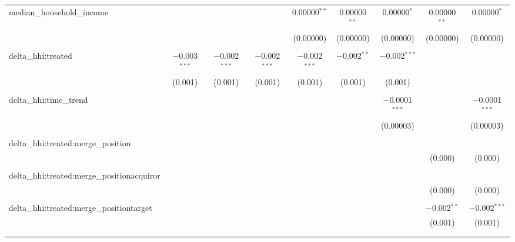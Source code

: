 \begin{table}[H]
{\begin{tabular}{@{\extracolsep{5pt}}lcccccccc}
  median\_household\_income &  &  &  & 0.00000$^{**}$ & 0.00000$^{**}$ & 0.00000$^{*}$ & 0.00000$^{**}$ & 0.00000$^{*}$ \\  

   &  &  &  & (0.00000) & (0.00000) & (0.00000) & (0.00000) & (0.00000) \\  

   & & & & & & & & \\  

  delta\_hhi:treated & $-$0.003$^{***}$ & $-$0.002$^{***}$ & $-$0.002$^{***}$ & $-$0.002$^{***}$ & $-$0.002$^{**}$ & $-$0.002$^{***}$ &  &  \\  

   & (0.001) & (0.001) & (0.001) & (0.001) & (0.001) & (0.001) &  &  \\  

   & & & & & & & & \\  

  delta\_hhi:time\_trend &  &  &  &  &  & $-$0.0001$^{***}$ &  & $-$0.0001$^{***}$ \\  

   &  &  &  &  &  & (0.00003) &  & (0.00003) \\  

   & & & & & & & & \\  

  delta\_hhi:treated:merge\_position &  &  &  &  &  &  &  &  \\  

   &  &  &  &  &  &  & (0.000) & (0.000) \\  

   & & & & & & & & \\  

  delta\_hhi:treated:merge\_positionacquiror &  &  &  &  &  &  &  &  \\  

   &  &  &  &  &  &  & (0.000) & (0.000) \\  

   & & & & & & & & \\  

  delta\_hhi:treated:merge\_positiontarget &  &  &  &  &  &  & $-$0.002$^{**}$ & $-$0.002$^{***}$ \\  

   &  &  &  &  &  &  & (0.001) & (0.001) \\  

   & & & & & & & & \\  

 \hline \\[-1.8ex]  


\end{tabular}}
\end{table}
